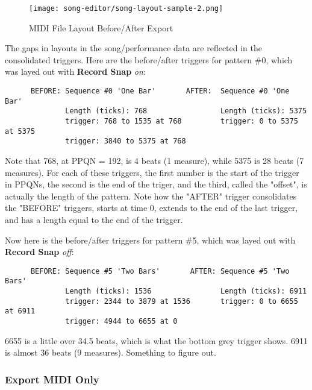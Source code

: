 \begin{figure}[H]
   \centering 
   \texttt{[image: song-editor/song-layout-sample-2.png]}
   \caption{MIDI File Layout Before/After Export}
   \label{fig:midi_export_file_before_after}
\end{figure}
   
   The gaps in layouts in the song/performance data are reflected in the
   consolidated triggers.
   Here are the before/after triggers for pattern \#0, which was
   layed out with \textbf{Record Snap} \textsl{on}:

   \begin{verbatim}
      BEFORE: Sequence #0 'One Bar'       AFTER:  Sequence #0 'One Bar'
              Length (ticks): 768                 Length (ticks): 5375
              trigger: 768 to 1535 at 768         trigger: 0 to 5375 at 5375
              trigger: 3840 to 5375 at 768        
   \end{verbatim}

   Note that 768, at PPQN = 192, is 4 beats (1 measure), while 5375 is 28
   beats (7 measures).
   For each of these triggers, the first number is the start of the trigger in
   PPQNs, the second is the end of the triger, and the third, called the
   "offset", is actually the length of the pattern.
   Note how the "AFTER"
   trigger consolidates the "BEFORE" triggers, starts at time 0, extends to
   the end of the last trigger, and has a length equal to the end of the
   trigger.

   Now here is the before/after triggers for pattern \#5, which was
   layed out with \textbf{Record Snap} \textsl{off}:

   \begin{verbatim}
      BEFORE: Sequence #5 'Two Bars'       AFTER: Sequence #5 'Two Bars'
              Length (ticks): 1536                Length (ticks): 6911
              trigger: 2344 to 3879 at 1536       trigger: 0 to 6655 at 6911
              trigger: 4944 to 6655 at 0
   \end{verbatim}

   6655 is a little over 34.5 beats, which is what the bottom grey trigger
   shows.
   6911 is almost 36 beats (9 measures).  Something to figure out.

\subsubsection{Export MIDI Only}
\label{subsubsec:midi_export_file_export_midi_only}

